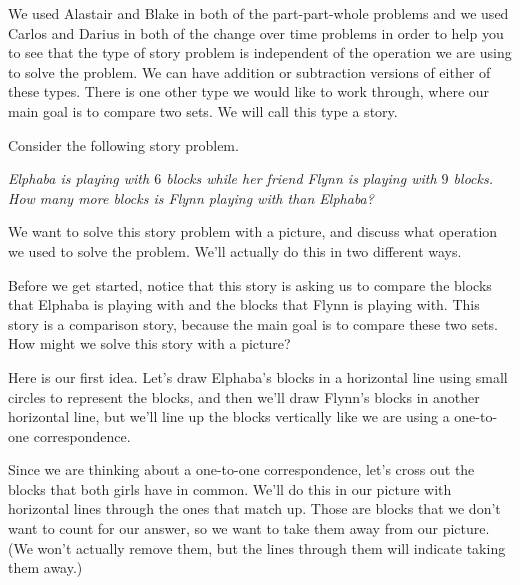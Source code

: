\documentclass{ximera}
\begin{document}
We used Alastair and Blake in both of the part-part-whole problems and we used Carlos and Darius in both of the change over time problems in order to help you to see that the type of story problem is independent of the operation we are using to solve the problem. We can have addition or subtraction versions of either of these types. There is one other type we would like to work through, where our main goal is to compare two sets. We will call this type a  story.

\begin{example}
Consider the following story problem.

\emph{Elphaba is playing with $6$ blocks while her friend Flynn is playing with $9$ blocks. How many more blocks is Flynn playing with than Elphaba?}

We want to solve this story problem with a picture, and discuss what operation we used to solve the problem. We'll actually do this in two different ways.

Before we get started, notice that this story is asking us to compare the blocks that Elphaba is playing with and the blocks that Flynn is playing with. This story is a comparison story, because the main goal is to compare these two sets. How might we solve this story with a picture?

Here is our first idea. Let's draw Elphaba's blocks in a horizontal line using small circles to represent the blocks, and then we'll draw Flynn's blocks in another horizontal line, but we'll line up the blocks vertically like we are using a one-to-one correspondence.

\begin{image}
\end{image}

Since we are thinking about a one-to-one correspondence, let's cross out the blocks that both girls have in common. We'll do this in our picture with horizontal lines through the ones that match up. Those are blocks that we don't want to count for our answer, so we want to take them away from our picture. (We won't actually remove them, but the lines through them will indicate taking them away.)


\end{example}
\end{document}
